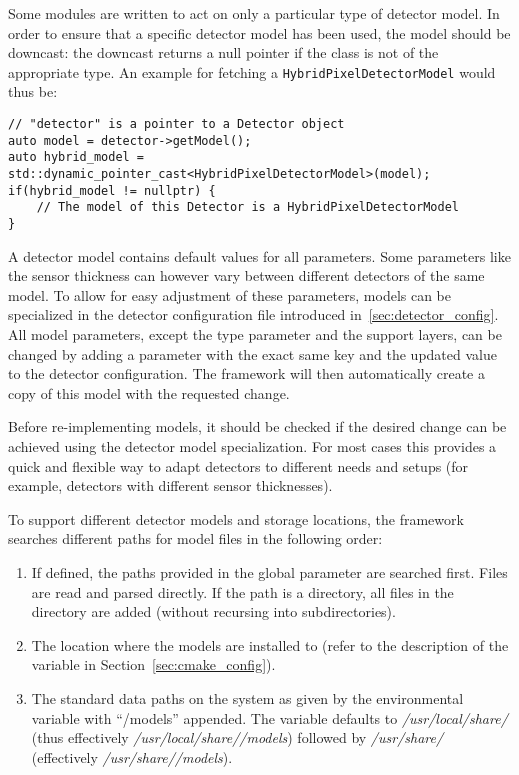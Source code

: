 Some modules are written to act on only a particular type of detector model.
In order to ensure that a specific detector model has been used, the model should be downcast: the downcast returns a null pointer if the class is not of the appropriate type.
An example for fetching a \texttt{HybridPixelDetectorModel} would thus be:
\begin{verbatim}
// "detector" is a pointer to a Detector object
auto model = detector->getModel();
auto hybrid_model = std::dynamic_pointer_cast<HybridPixelDetectorModel>(model);
if(hybrid_model != nullptr) {
    // The model of this Detector is a HybridPixelDetectorModel
}
\end{verbatim}

A detector model contains default values for all parameters.
Some parameters like the sensor thickness can however vary between different detectors of the same model.
To allow for easy adjustment of these parameters, models can be specialized in the detector configuration file introduced in~\ref{sec:detector_config}.
All model parameters, except the type parameter and the support layers, can be changed by adding a parameter with the exact same key and the updated value to the detector configuration.
The framework will then automatically create a copy of this model with the requested change.

\begin{warning}
Before re-implementing models, it should be checked if the desired change can be achieved using the detector model specialization. For most cases this provides a quick and flexible way to adapt detectors to different needs and setups (for example, detectors with different sensor thicknesses).
\end{warning}

To support different detector models and storage locations, the framework searches different paths for model files in the following order:
\begin{enumerate}
\item If defined, the paths provided in the global  parameter are searched first.
Files are read and parsed directly.
If the path is a directory, all files in the directory are added (without recursing into subdirectories).
\item The location where the models are installed to (refer to the description of the  variable in Section~\ref{sec:cmake_config}).
\item The standard data paths on the system as given by the environmental variable  with ``\project/models'' appended.
The  variable defaults to \textit{/usr/local/share/} (thus effectively \textit{/usr/local/share/\project/models}) followed by \textit{/usr/share/} (effectively \textit{/usr/share/\project/models}).
\end{enumerate}

